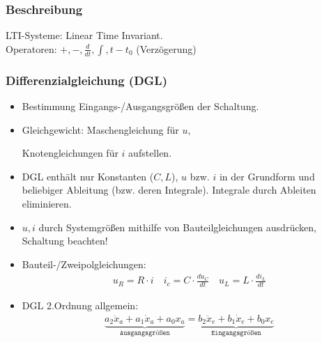 \subsubsection{Beschreibung}
 \small
LTI-Systeme: Linear Time Invariant.\\
Operatoren: $+, -, \frac{d}{dt}, \int, t-t_0$ (Verz\"ogerung)\\

\normalsize
\subsubsection{Differenzialgleichung (DGL)}
\begin{itemize}[leftmargin=*]
	\small
	\item Bestimmung Eingangs-/Ausgangsgr\"o\ss en der Schaltung.
	\item Gleichgewicht: Maschengleichung für $u$,\par Knotengleichungen f\"ur $i$ aufstellen.
	\item DGL enth\"alt nur Konstanten ($C,L$), $u$ bzw. $i$ in der Grundform und beliebiger Ableitung (bzw. deren Integrale). Integrale durch Ableiten eliminieren.
	\item $u,i$ durch Systemgr\"o\ss en mithilfe von Bauteilgleichungen ausdr\"ucken, Schaltung beachten!
	\normalsize
	\item Bauteil-/Zweipolgleichungen:
	\begin{gather*}
		u_R = R \cdot i \quad \boxed{i_c = C \cdot \frac{du_C}{dt}} \quad \boxed{u_L = L \cdot \frac{di_L}{dt}}
	\end{gather*}
	\item DGL 2.Ordnung allgemein:
\begin{gather*}
		\underbrace{a_2 \ddot{x}_a + a_1 \dot{x}_a + a_0 x_a}_{\texttt{Ausgangsgr\"o\ss en}} = \underbrace{b_2 \ddot{x}_e + b_1 \dot{x}_e + b_0 x_e}_{\texttt{Eingangsgr\"o\ss en}}
\end{gather*}
\end{itemize}

